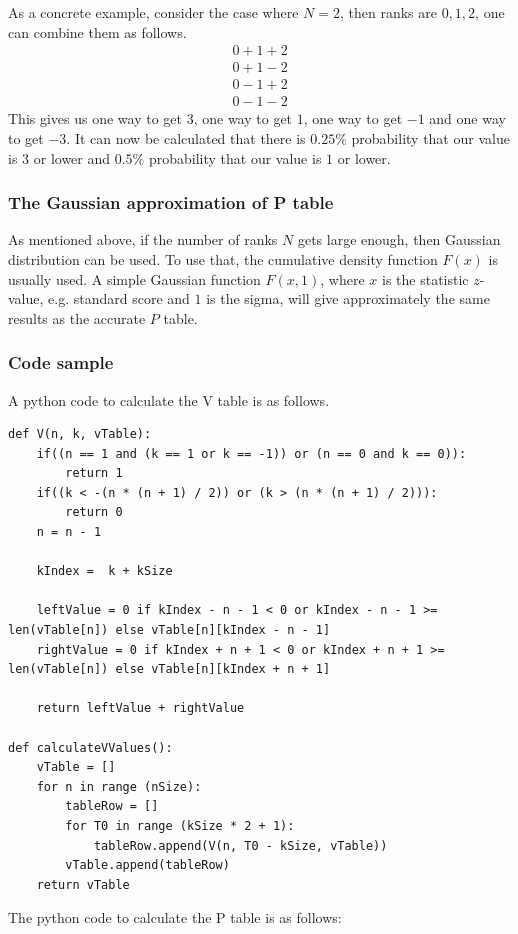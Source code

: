 \documentclass[12pt]{article}
\begin{document}
{As a concrete example, consider the case where $N=2$, then ranks are ${0, 1, 2}$, one can combine them as follows.
\begin{align*}
0 + 1 + 2 \\
0 + 1 - 2\\
0 - 1 + 2\\
0 - 1 - 2
\end{align*}
This gives us one way to get $3$, one way to get $1$, one way to get $-1$ and one way to get $-3$. It can now be calculated that there is $0.25\%$ probability that our value is $3$ or lower and $0.5\%$ probability that our value is $1$ or lower.

\subsubsection{The Gaussian approximation of P table}
As mentioned above, if the number of ranks $N$ gets large enough, then Gaussian distribution can be used. To use that, the cumulative density function $F(x)$ is usually used. A simple Gaussian function $F(x, 1)$, where $x$ is the statistic $z$-value, e.g. standard score and $1$ is the sigma, will give approximately the same results as the accurate $P$ table.

\subsubsection{Code sample}
A python code to calculate the V table is as follows.
\begin{lstlisting}
def V(n, k, vTable):
    if((n == 1 and (k == 1 or k == -1)) or (n == 0 and k == 0)):
        return 1
    if((k < -(n * (n + 1) / 2)) or (k > (n * (n + 1) / 2))):
        return 0
    n = n - 1

    kIndex =  k + kSize

    leftValue = 0 if kIndex - n - 1 < 0 or kIndex - n - 1 >= len(vTable[n]) else vTable[n][kIndex - n - 1]
    rightValue = 0 if kIndex + n + 1 < 0 or kIndex + n + 1 >= len(vTable[n]) else vTable[n][kIndex + n + 1]

    return leftValue + rightValue

def calculateVValues():
    vTable = []
    for n in range (nSize):
        tableRow = []
        for T0 in range (kSize * 2 + 1):
            tableRow.append(V(n, T0 - kSize, vTable))
        vTable.append(tableRow)
    return vTable

\end{lstlisting}
\newpage
The python code to calculate the P table is as follows:

}
\end{document}

